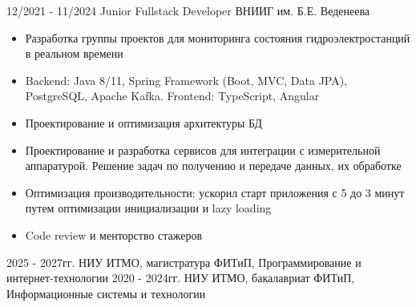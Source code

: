 \documentclass[9pt]{developercv} %
\begin{document}
\begin{entrylist}
{        }
    \entry
		{12/2021 - 11/2024}
        {Junior Fullstack Developer}
        {ВНИИГ им. Б.Е. Веденеева}
      {\vspace{-10pt}
        \begin{itemize}[noitemsep,topsep=0pt,parsep=0pt,partopsep=0pt, leftmargin=-1pt]
            \item {Разработка группы проектов для мониторинга состояния гидроэлектростанций в реальном времени}
            \item {Backend: Java 8/11, Spring Framework (Boot, MVC, Data JPA), PostgreSQL, Apache Kafka. Frontend: TypeScript, Angular}
            \item {Проектирование и оптимизация архитектуры БД}
            \item {Проектирование и разработка сервисов для интеграции с измерительной аппаратурой. Решение задач по получению и передаче данных, их обработке}
            \item {Оптимизация производительности: ускорил старт приложения с 5 до 3 минут путем оптимизации инициализации и lazy loading}
            \item {Code review и менторство стажеров}
        \end{itemize} 
        }
\end{entrylist}

\vspace{-10 pt}
\begin{entrylist}
    \entry
		{2025 - 2027гг.}
		{НИУ ИТМО, магистратура}
		{}
		{ФИТиП, Программирование и интернет-технологии}
    \entry
		{2020 - 2024гг.}
		{НИУ ИТМО, бакалавриат}
        {}
		{ФИТиП, Информационные системы и технологии}
    

    
\end{entrylist}
\end{document}
